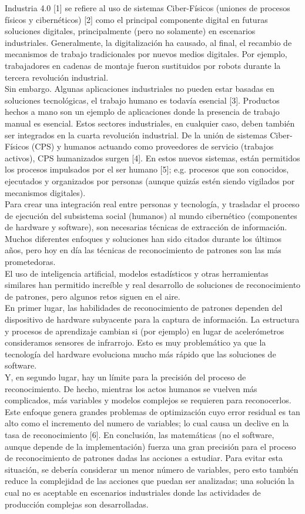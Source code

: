 \documentclass[10pt]{article}
\begin{document}
Industria 4.0 [1] se refiere al uso de sistemas Ciber-Físicos (uniones de procesos físicos y cibernéticos) [2] como el principal componente digital en futuras soluciones digitales, principalmente (pero no solamente) en escenarios industriales. Generalmente, la digitalización ha causado, al final, el recambio de mecanismos de trabajo tradicionales por nuevos medios digitales. Por ejemplo, trabajadores en cadenas de montaje fueron sustituidos por robots durante la tercera revolución industrial.
\\
Sin embargo. Algunas aplicaciones industriales no pueden estar basadas en soluciones tecnológicas, el trabajo humano es todavía esencial [3]. Productos hechos a mano son un ejemplo de aplicaciones donde la presencia de trabajo manual es esencial. Estos sectores industriales, en cualquier caso, deben también ser integrados en la cuarta revolución industrial. De la unión de sistemas Ciber-Físicos (CPS) y humanos actuando como proveedores de servicio (trabajos activos), CPS humanizados surgen [4]. En estos nuevos sistemas, están permitidos los procesos impulsados por el ser humano [5]; e.g. procesos que son conocidos, ejecutados y organizados por personas (aunque quizás estén siendo vigilados por mecanismos digitales).
\\
Para crear una integración real entre personas y tecnología, y trasladar el proceso de ejecución del subsistema social (humanos) al mundo cibernético (componentes de hardware y software), son necesarias técnicas de extracción de información. Muchos diferentes enfoques y soluciones han sido citados durante los últimos años, pero hoy en día las técnicas de reconocimiento de patrones son las más prometedoras.
\\
El uso de inteligencia artificial, modelos estadísticos y otras herramientas similares han permitido increíble y real desarrollo de soluciones de reconocimiento de patrones, pero algunos retos siguen en el aire.
\\
En primer lugar, las habilidades de reconocimiento de patrones dependen del dispositivo de hardware subyacente para la captura de información. La estructura y procesos de aprendizaje cambian si (por ejemplo) en lugar de acelerómetros consideramos sensores de infrarrojo. Esto es muy problemático ya que la tecnología del hardware evoluciona mucho más rápido que las soluciones de software.
\\
Y, en segundo lugar, hay un límite para la precisión del proceso de reconocimiento. De hecho, mientras los actos humanos se vuelven más complicados, más variables y modelos complejos se requieren para reconocerlos. Este enfoque genera grandes problemas de optimización cuyo error residual es tan alto como el incremento del numero de variables; lo cual causa un declive en la tasa de reconocimiento [6]. En conclusión, las matemáticas (no el software, aunque depende de la implementación) fuerza una gran precisión para el proceso de reconocimiento de patrones dadas las acciones a estudiar. Para evitar esta situación, se debería considerar un menor número de variables, pero esto también reduce la complejidad de las acciones que puedan ser analizadas; una solución la cual no es aceptable en escenarios industriales donde las actividades de producción complejas son desarrolladas.
\end{document}
